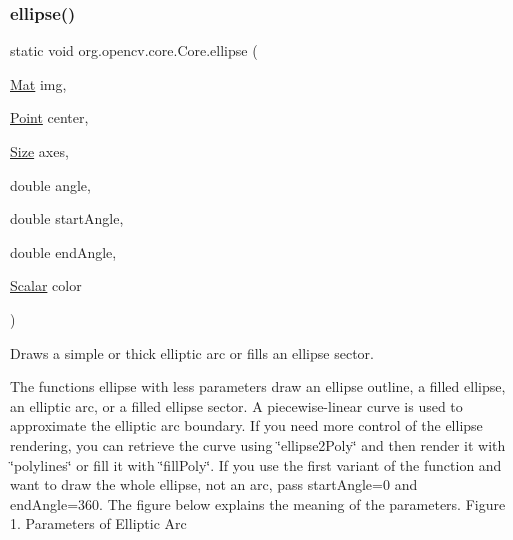 \subsubsection{\texorpdfstring{ellipse()}{ellipse()}\hspace{0.1cm}{\footnotesize\ttfamily [3/6]}}
{\footnotesize\ttfamily static void org.\+opencv.\+core.\+Core.\+ellipse (\begin{DoxyParamCaption}\item[{\mbox{\hyperlink{classorg_1_1opencv_1_1core_1_1_mat}{Mat}}}]{img,  }\item[{\mbox{\hyperlink{classorg_1_1opencv_1_1core_1_1_point}{Point}}}]{center,  }\item[{\mbox{\hyperlink{classorg_1_1opencv_1_1core_1_1_size}{Size}}}]{axes,  }\item[{double}]{angle,  }\item[{double}]{start\+Angle,  }\item[{double}]{end\+Angle,  }\item[{\mbox{\hyperlink{classorg_1_1opencv_1_1core_1_1_scalar}{Scalar}}}]{color }\end{DoxyParamCaption})\hspace{0.3cm}{\ttfamily [static]}}

Draws a simple or thick elliptic arc or fills an ellipse sector.

The functions {\ttfamily ellipse} with less parameters draw an ellipse outline, a filled ellipse, an elliptic arc, or a filled ellipse sector. A piecewise-\/linear curve is used to approximate the elliptic arc boundary. If you need more control of the ellipse rendering, you can retrieve the curve using \char`\"{}ellipse2\+Poly\char`\"{} and then render it with \char`\"{}polylines\char`\"{} or fill it with \char`\"{}fill\+Poly\char`\"{}. If you use the first variant of the function and want to draw the whole ellipse, not an arc, pass {\ttfamily start\+Angle=0} and {\ttfamily end\+Angle=360}. The figure below explains the meaning of the parameters. Figure 1. Parameters of Elliptic Arc


